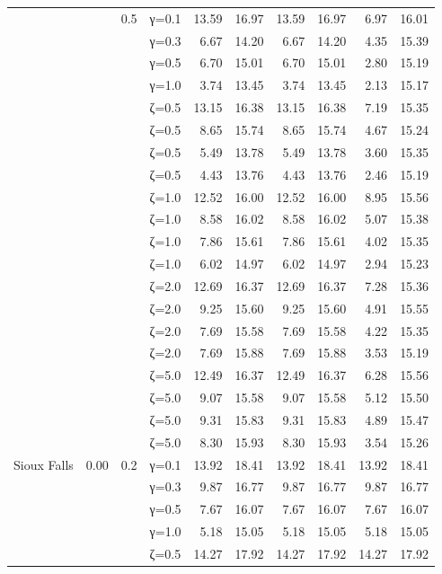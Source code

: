 \begin{table}[htbp]
\begin{tabular}{ll r l  rr  rr  rr}
  &  & 0.5 & γ=0.1 & 13.59 & 16.97 & 13.59 & 16.97 & 6.97 & 16.01 \\
  &  &  & γ=0.3 & 6.67 & 14.20 & 6.67 & 14.20 & 4.35 & 15.39 \\
  &  &  & γ=0.5 & 6.70 & 15.01 & 6.70 & 15.01 & 2.80 & 15.19 \\
  &  &  & γ=1.0 & 3.74 & 13.45 & 3.74 & 13.45 & 2.13 & 15.17 \\
  &  &  & ζ=0.5 & 13.15 & 16.38 & 13.15 & 16.38 & 7.19 & 15.35 \\
  &  &  & ζ=0.5 & 8.65 & 15.74 & 8.65 & 15.74 & 4.67 & 15.24 \\
  &  &  & ζ=0.5 & 5.49 & 13.78 & 5.49 & 13.78 & 3.60 & 15.35 \\
  &  &  & ζ=0.5 & 4.43 & 13.76 & 4.43 & 13.76 & 2.46 & 15.19 \\
  &  &  & ζ=1.0 & 12.52 & 16.00 & 12.52 & 16.00 & 8.95 & 15.56 \\
  &  &  & ζ=1.0 & 8.58 & 16.02 & 8.58 & 16.02 & 5.07 & 15.38 \\
  &  &  & ζ=1.0 & 7.86 & 15.61 & 7.86 & 15.61 & 4.02 & 15.35 \\
  &  &  & ζ=1.0 & 6.02 & 14.97 & 6.02 & 14.97 & 2.94 & 15.23 \\
  &  &  & ζ=2.0 & 12.69 & 16.37 & 12.69 & 16.37 & 7.28 & 15.36 \\
  &  &  & ζ=2.0 & 9.25 & 15.60 & 9.25 & 15.60 & 4.91 & 15.55 \\
  &  &  & ζ=2.0 & 7.69 & 15.58 & 7.69 & 15.58 & 4.22 & 15.35 \\
  &  &  & ζ=2.0 & 7.69 & 15.88 & 7.69 & 15.88 & 3.53 & 15.19 \\
  &  &  & ζ=5.0 & 12.49 & 16.37 & 12.49 & 16.37 & 6.28 & 15.56 \\
  &  &  & ζ=5.0 & 9.07 & 15.58 & 9.07 & 15.58 & 5.12 & 15.50 \\
  &  &  & ζ=5.0 & 9.31 & 15.83 & 9.31 & 15.83 & 4.89 & 15.47 \\
  &  &  & ζ=5.0 & 8.30 & 15.93 & 8.30 & 15.93 & 3.54 & 15.26 \\
\midrule
 Sioux Falls & 0.00 & 0.2 & γ=0.1 & 13.92 & 18.41 & 13.92 & 18.41 & 13.92 & 18.41 \\
  &  &  & γ=0.3 & 9.87 & 16.77 & 9.87 & 16.77 & 9.87 & 16.77 \\
  &  &  & γ=0.5 & 7.67 & 16.07 & 7.67 & 16.07 & 7.67 & 16.07 \\
  &  &  & γ=1.0 & 5.18 & 15.05 & 5.18 & 15.05 & 5.18 & 15.05 \\
  &  &  & ζ=0.5 & 14.27 & 17.92 & 14.27 & 17.92 & 14.27 & 17.92 \\

\end{tabular}
\end{table}
